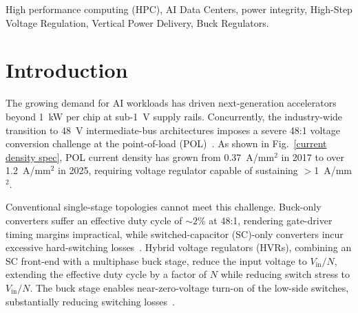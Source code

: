 \documentclass[conference]{IEEEtran}
\begin{document}
\begin{abstract}

Point-of-load power conversion for AI accelerators is no longer a single-converter problem---it is a coupled topology, device, passive,
switching frequency, and packaging co-optimization that cannot be
tractably solved by manual design. A model-driven framework for
series-capacitor buck hybrid voltage regulators (SC-Buck HVRs) is
proposed. Given user-specified conversion ratio, load current,
current density target, and package model, the framework enumerates all feasible
multi-phase architectures and co-optimizes devices, passives, and
switching frequency over real component libraries via a closed-form
loss model. Ripple, saturation, voltage-rating, and
area constraints are enforced throughout the optimization. The framework is validated against
Cadence Virtuoso/Spectre-designed SOTA topologies at
\textbf{95.27\,$\pm$\,1\%} loss prediction accuracy. Up to
\textbf{+4.6~pp} efficiency improvement and \textbf{29.2$\times$}
footprint reduction over SOTA baselines are demonstrated at identical
topology. 
Packaging-aware design-space exploration demonstrates that the optimal converter topology and component selections vary significantly across package implementations, highlighting the necessity of package-aware optimization.


\end{abstract}

\begin{IEEEkeywords}
High performance computing (HPC), AI Data Centers, power integrity, High-Step Voltage Regulation, Vertical Power Delivery, Buck Regulators.
\end{IEEEkeywords}

\section{Introduction}
The growing demand for AI workloads has driven next-generation accelerators beyond 1~kW per chip at sub-1~V supply rails. Concurrently, the industry-wide transition to 48~V intermediate-bus architectures imposes a severe 48:1 voltage conversion challenge at the point-of-load (POL)~\cite{Sri_SOCC,ECTCSalma26, EPEPS}. As shown in Fig.~\ref{current density spec}, POL current density has grown from 0.37~A/mm$^2$ in 2017 to over 1.2~A/mm$^2$ in 2025, requiring voltage regulator capable of sustaining $>$1~A/mm$^2$.%

Conventional single-stage topologies cannot meet this challenge.
Buck-only converters suffer an effective duty cycle of ${\sim}2\%$ at 48:1, rendering gate-driver timing margins impractical, while switched-capacitor (SC)-only converters
incur excessive hard-switching losses~\cite{comparison_SCbuck_and_buck}. 
Hybrid voltage regulators (HVRs), combining an SC front-end with a multiphase buck stage, reduce the input voltage to $V_\mathrm{in}/N$, extending the effective duty cycle by a factor of $N$ while
reducing switch stress to $V_\mathrm{in}/N$. The buck stage enables near-zero-voltage
turn-on of the low-side switches, substantially reducing switching losses~\cite{DPMIH44, DSCH, DSCB, DPMIH62}.
\end{document}
